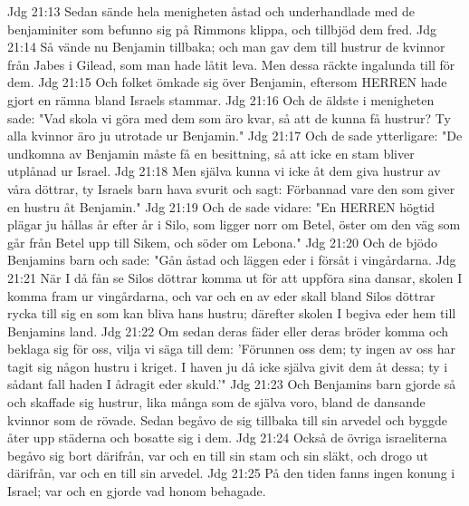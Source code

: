 Jdg 21:13  Sedan sände hela menigheten åstad och underhandlade med de benjaminiter som befunno sig på Rimmons klippa, och tillbjöd dem fred.
Jdg 21:14  Så vände nu Benjamin tillbaka; och man gav dem till hustrur de kvinnor från Jabes i Gilead, som man hade låtit leva. Men dessa räckte ingalunda till för dem.
Jdg 21:15  Och folket ömkade sig över Benjamin, eftersom HERREN hade gjort en rämna bland Israels stammar.
Jdg 21:16  Och de äldste i menigheten sade: "Vad skola vi göra med dem som äro kvar, så att de kunna få hustrur? Ty alla kvinnor äro ju utrotade ur Benjamin."
Jdg 21:17  Och de sade ytterligare: "De undkomna av Benjamin måste få en besittning, så att icke en stam bliver utplånad ur Israel.
Jdg 21:18  Men själva kunna vi icke åt dem giva hustrur av våra döttrar, ty Israels barn hava svurit och sagt: Förbannad vare den som giver en hustru åt Benjamin."
Jdg 21:19  Och de sade vidare: "En HERREN högtid plägar ju hållas år efter år i Silo, som ligger norr om Betel, öster om den väg som går från Betel upp till Sikem, och söder om Lebona."
Jdg 21:20  Och de bjödo Benjamins barn och sade: "Gån åstad och läggen eder i försåt i vingårdarna.
Jdg 21:21  När I då fån se Silos döttrar komma ut för att uppföra sina dansar, skolen I komma fram ur vingårdarna, och var och en av eder skall bland Silos döttrar rycka till sig en som kan bliva hans hustru; därefter skolen I begiva eder hem till Benjamins land.
Jdg 21:22  Om sedan deras fäder eller deras bröder komma och beklaga sig för oss, vilja vi säga till dem: 'Förunnen oss dem; ty ingen av oss har tagit sig någon hustru i kriget. I haven ju då icke själva givit dem åt dessa; ty i sådant fall haden I ådragit eder skuld.'"
Jdg 21:23  Och Benjamins barn gjorde så och skaffade sig hustrur, lika många som de själva voro, bland de dansande kvinnor som de rövade. Sedan begåvo de sig tillbaka till sin arvedel och byggde åter upp städerna och bosatte sig i dem.
Jdg 21:24  Också de övriga israeliterna begåvo sig bort därifrån, var och en till sin stam och sin släkt, och drogo ut därifrån, var och en till sin arvedel.
Jdg 21:25  På den tiden fanns ingen konung i Israel; var och en gjorde vad honom behagade.


